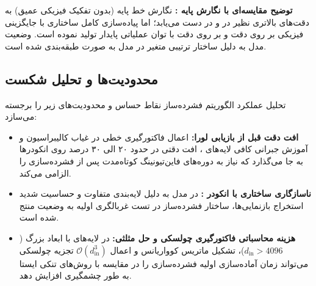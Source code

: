 \textbf{توضیح مقایسه‌ای با نگارش پایه :} نگارش خط پایه  (بدون تفکیک فیزیکی عمیق) به دقت‌های بالاتری نظیر  در  و  در  دست می‌یابد؛ اما پیاده‌سازی کامل ساختاری  با جایگزینی فیزیکی  بر روی  دقت  و بر روی  دقت  با توان عملیاتی پایدار  تولید نموده است. وضعیت مدل  به دلیل ساختار ترتیبی متغیر در مدل به صورت  طبقه‌بندی شده است.

\subsection{محدودیت‌ها و تحلیل شکست}
تحلیل عملکرد الگوریتم فشرده‌ساز  نقاط حساس و محدودیت‌های زیر را برجسته می‌سازد:
\begin{itemize}
    \item \textbf{افت دقت قبل از بازیابی لورا:} اعمال فاکتورگیری خطی در غیاب کالیبراسیون و آموزش جبرانی کافی لایه‌های ، افت دقتی در حدود ۲۰ الی ۳۰ درصد روی انکودرها به جا می‌گذارد که نیاز به دوره‌های فاین‌تیونینگ کوتاه‌مدت پس از فشرده‌سازی را الزامی می‌کند.
    \item \textbf{ناسازگاری ساختاری با انکودر :} در مدل  به دلیل لایه‌بندی متفاوت و حساسیت شدید استخراج بازنمایی‌ها، ساختار فشرده‌ساز در تست غربالگری اولیه به وضعیت  منتج شده است.
    \item \textbf{هزینه محاسباتی فاکتورگیری چولسکی و حل مثلثی:} در لایه‌های با ابعاد بزرگ ($d_{\text{in}} > 4096$)، تشکیل ماتریس کوواریانس و اعمال $\mathcal{O}(d_{\text{in}}^3)$ تجزیه چولسکی می‌تواند زمان آماده‌سازی اولیه فشرده‌سازی را در مقایسه با روش‌های تنکی ایستا به طور چشمگیری افزایش دهد.
\end{itemize}
